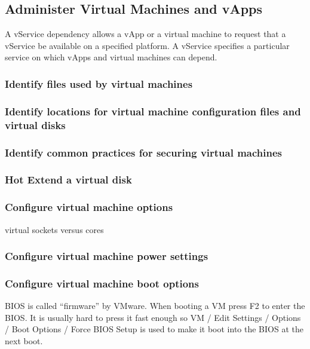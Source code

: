 \subsection{Administer Virtual Machines and vApps}

A vService dependency allows a vApp or a virtual machine to request that a
vService be available on a specified platform. A vService specifies a
particular service on which vApps and virtual machines can depend.

\subsubsection{Identify files used by virtual machines}

\subsubsection{Identify locations for virtual machine configuration files and virtual disks}

\subsubsection{Identify common practices for securing virtual machines}

\subsubsection{Hot Extend a virtual disk}

\subsubsection{Configure virtual machine options}

virtual sockets versus cores

\subsubsection{Configure virtual machine power settings}

\subsubsection{Configure virtual machine boot options}

BIOS is called ``firmware'' by VMware. When booting a VM press F2 to enter
the BIOS. It is usually hard to press it fast enough so VM / Edit Settings /
Options / Boot Options / Force BIOS Setup is used to make it boot into the
BIOS at the next boot.\\

